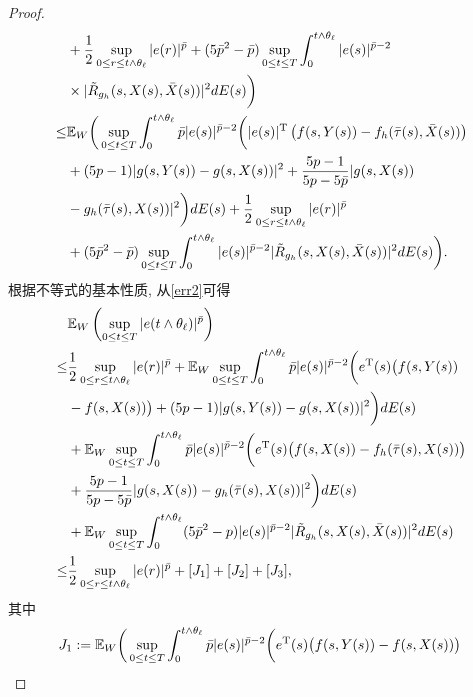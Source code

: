 \begin{proof}
\begin{align}
    \quad&
    +\frac{1}{2}\sup_{0\leq r\leq t\wedge\theta_{\ell}}|e(r)|^{\bar{p}}+(5{\bar{p}}^{2}-\bar{p})\sup_{0\leq t\leq T}\int^{t\wedge\theta_{\ell}}_{0}|e(s)|^{\bar{p}-2}\nonumber\\
    \quad& \times|\tilde{R}_{g_h}(s,X(s),\bar{X}(s))|^2dE(s)\bigg)\nonumber\\
    \leq&\mathbb{E}_W\bigg(\sup_{0\leq t\leq T}\int^{t\wedge\theta_{\ell}}_{0}\bar{p}|e(s)|^{\bar{p}-2}\bigg(|e(s)|^{\mathrm{T}}\left(f(s,Y(s))-f_{h}(\bar{\tau}(s),\bar{X}(s))\right)\nonumber\\
    \quad& +(5p-1)|g(s,Y(s))-g(s,X(s))|^{2}
    +\dfrac{5p-1}{5p-5\bar{p}}|g(s,X(s))\nonumber\\
    \quad&
    -g_{h}(\bar{\tau}(s),X(s))|^{2}\bigg)dE(s)+\frac{1}{2}\sup_{0\leq r\leq t\wedge\theta_{\ell}}|e(r)|^{\bar{p}}\nonumber\\
    \quad&+(5{\bar{p}}^{2}-\bar{p})\sup_{0\leq t\leq T}\int^{t\wedge\theta_{\ell}}_{0}|e(s)|^{\bar{p}-2}|\tilde{R}_{g_h}(s,X(s),\bar{X}(s))|^2dE(s)\bigg).
\end{align}
根据不等式的基本性质, 从\eqref{err2}可得
\begin{align}
    \label{sup}
    &\mathbb{E}_W\left(\sup_{0\leq t\leq T}|e( t\wedge\theta_{\ell})|^{\bar{p}}\right)\nonumber\\
    \leq& \frac{1}{2}\sup_{0\leq r\leq t\wedge\theta_{\ell}}|e(r)|^{\bar{p}}
    +\mathbb{E}_W\sup_{0\leq t\leq T}\int^{t\wedge\theta_{\ell}}_{0}\bar{p}|e(s)|^{\bar{p}-2}\bigg(e^{\mathrm{T}}(s)\big(f(s,Y(s))\nonumber\\
    &-f(s,X(s))\big)
    +(5p-1)|g(s,Y(s))-g(s,X(s))|^2\bigg)dE(s)\nonumber\\
    &+\mathbb{E}_W\sup_{0\leq t\leq T}\int^{t\wedge\theta_{\ell}}_{0}\bar{p}|e(s)|^{\bar{p}-2}\bigg(e^{\mathrm{T}}(s)\big(f(s,X(s))-f_{h}(\bar{\tau}(s),X(s))\big)\nonumber\\
    \quad &+\dfrac{5p-1}{5p-5\bar{p}}|g(s,X(s))-g_{h}(\bar{\tau}(s),X(s))|^2\bigg)dE(s)\nonumber\\
    &+\mathbb{E}_W\sup_{0\leq t\leq T}\int^{t\wedge\theta_{\ell}}_{0}(5\bar{p}^{2}-p)|e(s)|^{\bar{p}-2}|\tilde{R}_{g_h}(s,X(s),\bar{X}(s))|^2dE(s)\nonumber\\
    \leq& \frac{1}{2}\sup_{0\leq r\leq t\wedge\theta_{\ell}}|e(r)|^{\bar{p}}+[J_1]+[J_2]+[J_3],
\end{align}
其中
\begin{align*}
    J_1&:=\EE_W \bigg(\sup_{0\leq t\leq T}\int^{t\wedge\theta_{\ell}}_{0}\bar{p}|e(s)|^{\bar{p}-2}\bigg(e^{\mathrm{T}}(s)\big(f(s,Y(s))-f(s,X(s))\big)\\

\end{align*}
\end{proof}
